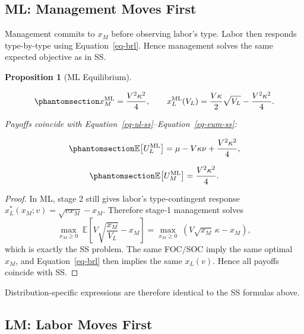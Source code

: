 \documentclass[
  english,
  a4paper,
  12pt]{article}
\newcommand{\E}{\mathbb{E}}
\theoremstyle{plain}
\newtheorem{proposition}{Proposition}[section]
\theoremstyle{plain}
\theoremstyle{definition}
\theoremstyle{remark}
\begin{document}
\subsection{ML: Management Moves First}\label{sec-ml}

Management commits to \(x_M\) before observing labor's type. Labor then
responds type-by-type using Equation~\ref{eq-brl}. Hence management
solves the same expected objective as in SS.

\begin{proposition}[ML
Equilibrium]\protect\hypertarget{prp-ml}{}\label{prp-ml}

\begin{equation}\phantomsection\label{eq-ml-efforts}{
x_M^{\mathrm{ML}} = \frac{V^2\kappa^2}{4}, \qquad
x_L^{\mathrm{ML}}(V_L)
  = \frac{V\kappa}{2}\sqrt{V_L} - \frac{V^2\kappa^2}{4}.
}\end{equation}

Payoffs coincide with Equation~\ref{eq-ul-ss}--Equation~\ref{eq-eum-ss}:

\begin{equation}\phantomsection\label{eq-eul-ml}{
\E\!\left[U_L^{\mathrm{ML}}\right]
  = \mu - V\kappa\nu + \frac{V^2\kappa^2}{4},
}\end{equation}

\begin{equation}\phantomsection\label{eq-eum-ml}{
\E\!\left[U_M^{\mathrm{ML}}\right]
  = \frac{V^2\kappa^2}{4}.
}\end{equation}

\end{proposition}

\begin{proof}
In ML, stage 2 still gives labor's type-contingent response
\(x_L^*(x_M;v)=\sqrt{vx_M}-x_M\). Therefore stage-1 management solves \[
\max_{x_M\ge 0}\;\E\!\left[V\sqrt{\frac{x_M}{V_L}}-x_M\right]
=\max_{x_M\ge 0}\;\left(V\sqrt{x_M}\,\kappa-x_M\right),
\] which is exactly the SS problem. The same FOC/SOC imply the same
optimal \(x_M\), and Equation~\ref{eq-brl} then implies the same
\(x_L(v)\). Hence all payoffs coincide with SS.
\end{proof}

Distribution-specific expressions are therefore identical to the SS
formulas above.

\subsection{LM: Labor Moves First}\label{sec-lm}
\end{document}

